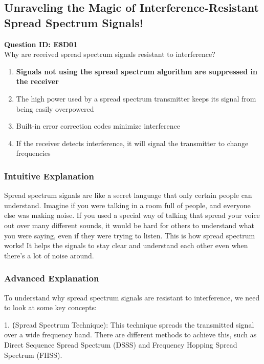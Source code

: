 \subsection{Unraveling the Magic of Interference-Resistant Spread Spectrum Signals!}

\begin{tcolorbox}[colback=blue!5!white, colframe=blue!75!black, title={Question E8D01}]
    \textbf{Question ID: E8D01} \\
    Why are received spread spectrum signals resistant to interference? 
    \begin{enumerate}[label=\Alph*.]
        \item \textbf{Signals not using the spread spectrum algorithm are suppressed in the receiver}
        \item The high power used by a spread spectrum transmitter keeps its signal from being easily overpowered
        \item Built-in error correction codes minimize interference
        \item If the receiver detects interference, it will signal the transmitter to change frequencies
    \end{enumerate}
\end{tcolorbox}

\subsubsection{Intuitive Explanation}
Spread spectrum signals are like a secret language that only certain people can understand. Imagine if you were talking in a room full of people, and everyone else was making noise. If you used a special way of talking that spread your voice out over many different sounds, it would be hard for others to understand what you were saying, even if they were trying to listen. This is how spread spectrum works! It helps the signals to stay clear and understand each other even when there’s a lot of noise around.

\subsubsection{Advanced Explanation}
To understand why spread spectrum signals are resistant to interference, we need to look at some key concepts: 

1. \textbf(Spread Spectrum Technique): This technique spreads the transmitted signal over a wide frequency band. There are different methods to achieve this, such as Direct Sequence Spread Spectrum (DSSS) and Frequency Hopping Spread Spectrum (FHSS).

